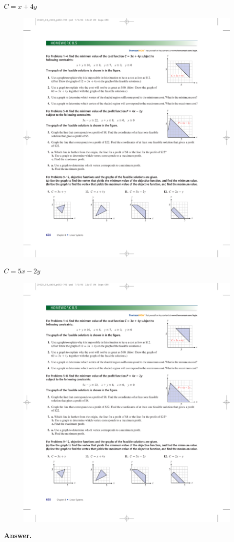 \documentclass[10pt,]{book}
\theoremstyle{plain}
\theoremstyle{definition}
\theoremstyle{definition}
\theoremstyle{definition}
\numberwithin{equation}{part}
\begin{document}
\begin{exercisegroup}
%
\exercise[10.]\hypertarget{exercise-14}{}\(C = x + 4y\)\leavevmode%
\begin{figure}
\centering
\includegraphics[width=0.7\linewidth]{images/fig-8-5-10}
\end{figure}
%
\exercise[11.]\hypertarget{exercise-15}{}\(C = 5x − 2y\)\leavevmode%
\begin{figure}
\centering
\includegraphics[width=0.7\linewidth]{images/fig-8-5-11}
\end{figure}
%
\par\smallskip
\noindent\textbf{Answer.}\hypertarget{answer-10}{}\quad

\end{exercisegroup}
\end{document}
